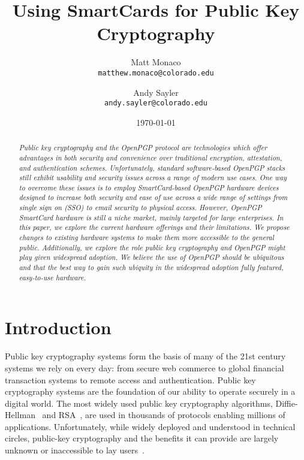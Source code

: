 \documentclass[11pt, twocolumn]{article}
\begin{document}
\title{Using SmartCards for Public Key Cryptography}

\author{
  Matt Monaco \\ \texttt{matthew.monaco@colorado.edu} \and
  Andy Sayler \\ \texttt{andy.sayler@colorado.edu}
}

\date{\today}

\maketitle

\begin{abstract}
\emph{Public key cryptography and the OpenPGP protocol are
  technologies which offer advantages in both security and convenience
  over traditional encryption, attestation, and authentication
  schemes. Unfortunately, standard software-based OpenPGP stacks still
  exhibit usability and security issues across a range of modern use
  cases. One way to overcome these issues is to employ SmartCard-based
  OpenPGP hardware devices designed to increase both security and ease
  of use across a wide range of settings from single sign on (SSO) to
  email security to physical access. However, OpenPGP SmartCard
  hardware is still a niche market, mainly targeted for large
  enterprises. In this paper, we explore the current hardware
  offerings and their limitations. We propose changes to existing
  hardware systems to make them more accessible to the general
  public. Additionally, we explore the role public key cryptography
  and OpenPGP might play given widespread adoption. We believe the use
  of OpenPGP should be ubiquitous and that the best way to gain such
  ubiquity in the widespread adoption fully featured, easy-to-use
  hardware.}
\end{abstract}

\section{Introduction}
\label{sec:intro}

Public key cryptography systems form the basis of many of the 21st
century systems we rely on every day: from secure web commerce to
global financial transaction systems to remote access and
authentication. Public key cryptography systems are the foundation of
our ability to operate securely in a digital world. The most widely
used public key cryptography algorithms,
Diffie-Hellman~\cite{diffie1976} and RSA~\cite{rivest1978}, are used
in thousands of protocols enabling millions of
applications. Unfortunately, while widely deployed and understood in
technical circles, public-key cryptography and the benefits it can
provide are largely unknown or inaccessible to lay
users~\cite{whitten1999}.
\end{document}
